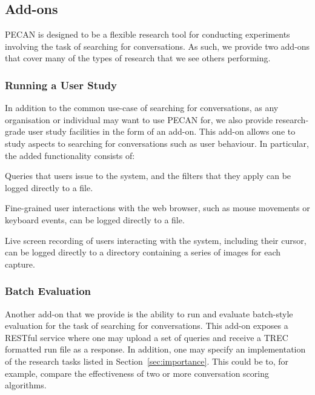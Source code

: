 \subsection{Add-ons}

PECAN is designed to be a flexible research tool for conducting experiments involving the task of searching for conversations. As such, we provide two add-ons that cover many of the types of research that we see others performing.

\subsubsection{Running a User Study}

In addition to the common use-case of searching for conversations, as any organisation or individual may want to use PECAN for, we also provide research-grade user study facilities in the form of an add-on. This add-on allows one to study aspects to searching for conversations such as user behaviour. In particular, the added functionality consists of:
\begin{description}[noitemsep, leftmargin=8pt]
\item[Query Logging] Queries that users issue to the system, and the filters that they apply can be logged directly to a file. 
\item[Interaction Logging] Fine-grained user interactions with the web browser, such as mouse movements or keyboard events, can be logged directly to a file.
\item[Screen Recording] Live screen recording of users interacting with the system, including their cursor, can be logged directly to a directory containing a series of images for each capture.
\end{description}

\subsubsection{Batch Evaluation}

Another add-on that we provide is the ability to run and evaluate batch-style evaluation for the task of searching for conversations. This add-on exposes a RESTful service where one may upload a set of queries and receive a TREC formatted run file as a response. In addition, one may specify an implementation of the research tasks listed in Section~\ref{sec:importance}. This could be to, for example, compare the effectiveness of two or more conversation scoring algorithms. 


%





